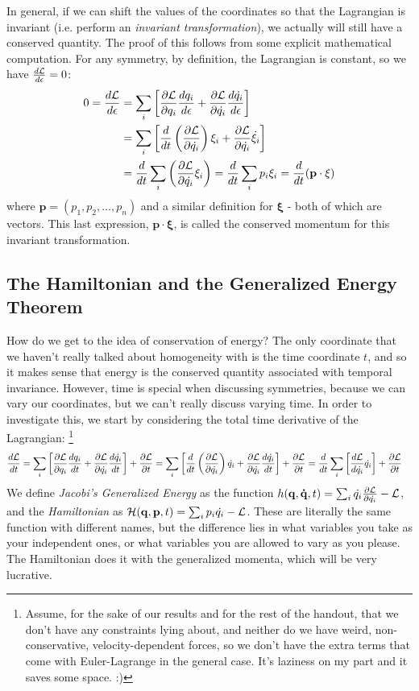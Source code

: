 In general, if we can shift the values of the coordinates so that the Lagrangian is invariant (i.e. perform an \textit{invariant transformation}), we actually will still have a conserved quantity. The proof of this follows from some explicit mathematical computation. For any symmetry, by definition, the Lagrangian is constant, so we have $\frac{d \mathcal{L}}{d \epsilon} = 0$: 
\begin{align*}
	0 = \frac{d \mathcal{L}}{d \epsilon} &= \sum_i \left[\frac{\partial \mathcal{L}}{\partial q_i} \frac{d q_i}{d \epsilon} + \frac{\partial \mathcal{L}}{\partial \dot{q_i}} \frac{d \dot{q_i}}{d \epsilon} \right] \\
	&= \sum_i \left[\frac{d }{d t} \left(\frac{\partial \mathcal{L}}{\partial \dot{q_i}} \right)\xi_i + \frac{\partial \mathcal{L}}{\partial \dot{q_i}}\dot{\xi_i}  \right] \\ 
	&= \frac{d }{d t} \sum_i \left(\frac{\partial \mathcal{L}}{\partial \dot{q_i}} \xi_i \right) = \frac{d }{d t} \sum_i p_i \xi_i = \frac{d }{d t}(\mathbf{p} \cdot \mathbf{\xi})
\end{align*}
where $\mathbf{p} = (p_1, p_2, \ldots, p_n)$ and a similar definition for $\mathbf{\xi}$ - both of which are vectors. This last expression, $\mathbf{p} \cdot \mathbf{\xi}$, is called the conserved momentum for this invariant transformation. 

\subsection{The Hamiltonian and the Generalized Energy Theorem}
How do we get to the idea of conservation of energy? The only coordinate that we haven't really talked about homogeneity with is the time coordinate $t$, and so it makes sense that energy is the conserved quantity associated with temporal invariance. However, time is special when discussing symmetries, because we can vary our coordinates, but we can't really discuss varying time. In order to investigate this, we start by considering the total time derivative of the Lagrangian: \footnote{Assume, for the sake of our results and for the rest of the handout, that we don't have any constraints lying about, and neither do we have weird, non-conservative, velocity-dependent forces, so we don't have the extra terms that come with Euler-Lagrange in the general case. It's laziness on my part and it saves some space. :)}
\begin{align*}
	\frac{d \mathcal{L}}{d t} &= \sum_i \left[\frac{\partial \mathcal{L}}{\partial q_i}\frac{d q_i}{d t} + \frac{\partial \mathcal{L}}{\partial \dot{q_i}}\frac{d \dot{q_i}}{d t} \right] + \frac{\partial \mathcal{L}}{\partial t}  = \sum_i \left[\frac{d }{d t}\left(\frac{\partial \mathcal{L}}{\partial \dot{q_i}}\right) \dot{q_i} + \frac{\partial \mathcal{L}}{\partial \dot{q_i}}\frac{d \dot{q_i}}{d t} \right] + \frac{\partial \mathcal{L}}{\partial t} = \frac{d }{d t} \sum_i \left[\frac{d \mathcal{L}}{d \dot{q_i}}\dot{q_i}\right] + \frac{\partial \mathcal{L}}{\partial t} 
\end{align*}
We define \textit{Jacobi's Generalized Energy} as the function $h(\mathbf{q}, \mathbf{\dot{q}}, t) = \sum_i \dot{q_i}\frac{\partial \mathcal{L}}{\partial \dot{q_i}} - \mathcal{L}$, and the \textit{Hamiltonian} as $\mathcal{H}(\mathbf{q}, \mathbf{p}, t) = \sum_i p_i\dot{q_i} - \mathcal{L}$. These are literally the same function with different names, but the difference lies in what variables you take as your independent ones, or what variables you are allowed to vary as you please. The Hamiltonian does it with the generalized momenta, which will be very lucrative. 


